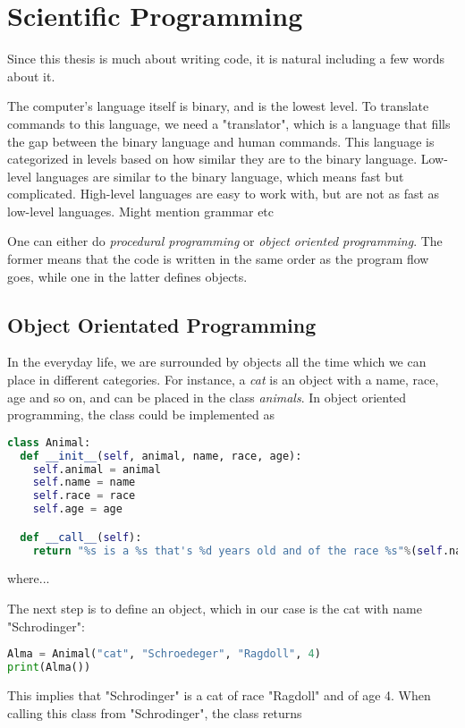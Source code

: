 \chapter{Scientific Programming}
Since this thesis is much about writing code, it is natural including a few words about it. 

The computer's language itself is binary, and is the lowest level. To translate commands to this language, we need a "translator", which is a language that fills the gap between the binary language and human commands. This language is categorized in levels based on how similar they are to the binary language. Low-level languages are similar to the binary language, which means fast but complicated. High-level languages are easy to work with, but are not as fast as low-level languages. Might mention grammar etc

One can either do \textit{procedural programming} or \textit{object oriented programming}. The former means that the code is written in the same order as the program flow goes, while one in the latter defines objects. 

\section{Object Orientated Programming}
In the everyday life, we are surrounded by objects all the time which we can place in different categories. For instance, a \textit{cat} is an object with a name, race, age and so on, and can be placed in the class \textit{animals}. In object oriented programming, the class could be implemented as

\lstset{basicstyle=\scriptsize}
\begin{lstlisting}[language=python]
class Animal:
  def __init__(self, animal, name, race, age):
    self.animal = animal
    self.name = name
    self.race = race
    self.age = age

  def __call__(self):
    return "%s is a %s that's %d years old and of the race %s"%(self.name, self.animal, self.age, self.race)
\end{lstlisting}
where...

The next step is to define an object, which in our case is the cat with name "Schrodinger":

\lstset{basicstyle=\scriptsize}
\begin{lstlisting}[language=python]
Alma = Animal("cat", "Schroedeger", "Ragdoll", 4)
print(Alma())
\end{lstlisting}
This implies that "Schrodinger" is a cat of race "Ragdoll" and of age 4. When calling this class from "Schrodinger", the class returns

